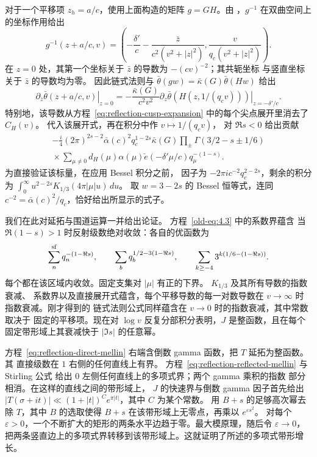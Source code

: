 对于一个平移项 $z_h=a/c$，使用上面构造的矩阵 $g=GH$。由
\cite[方程 (5.1)]{DR}，$g^{-1}$ 在双曲空间上的坐标作用给出
\[
 g^{-1}(z+a/c,v)=
 \left(-\frac{\delta'}c-\frac{\bar z}{c^2(v^2+|z|^2)},
               \frac{v}{q_c(v^2+|z|^2)}\right).
\]
在 $z=0$ 处，其第一个坐标关于
$\bar z$ 的导数为 $-(cv)^{-2}$；其共轭坐标
与竖直坐标关于 $\bar z$ 的导数均为零。
因此链式法则与 $\bar\theta(gw)=\bar\kappa(G)\bar\theta(Hw)$
给出
\[
 \left.\partial_{\bar z}\bar\theta(z+a/c,v)\right|_{z=0}
 =-\frac{\bar\kappa(G)}{c^2v^2}
   \left.\partial_z\bar\theta(H(z,1/(q_cv)))\right|_{z=-\delta'/c}.
\]
特别地，该导数从方程~\eqref{eq:reflection-cusp-expansion} 中的每个尖点展开里消去了 $C_H(v)$。
代入该展开式，再在积分中作 $v\mapsto1/(q_cv)$，
对 $\Re s<0$ 给出贡献
\begin{equation}\label{eq:reflection-reflected-mellin}
 \begin{split}
 -\frac i4(2\pi)^{2s-2}\bar\alpha(c)^2q_c^{1-2s}\bar\kappa(G)
 \prod_{\pm}\Gamma(3/2-s\pm1/6)\\
 {}
 \times\sum_{\mu\ne0}d_H(\mu)\alpha(\mu)
       \check e(-\delta'\mu/c)q_\mu^{-(1-s)}.
 \end{split}
\end{equation}
为直接验证该标量，在应用 Bessel 积分之前，
因子为 $-2\pi i c^{-2}q_c^{2-2s}$，剩余的积分为
$\int_0^\infty u^{2-2s}K_{1/3}(4\pi|\mu|u)\,du$。
取 $w=3-2s$ 的 Bessel 恒等式，连同
$c^{-2}=\bar\alpha(c)^2/q_c$，恰好给出所显示的式子。

我们在此对延拓与围道运算一并给出论证。
方程~\eqref{old-eq:4.3} 中的系数界蕴含
当 $\Re(1-s)>1$ 时反射级数绝对收敛：各自的优函数为
\[
 \sum_n^{\rm sf}q_n^{-(1-\Re s)},\qquad
 \sum_b q_b^{1/2-3(1-\Re s)},\qquad
 \sum_{k\ge-4}3^{k(1/6-(1-\Re s))}.
\]
每个都在该区域内收敛。固定支集对 $|\mu|$ 有正的下界。
$K_{1/3}$ 及其所有导数的指数衰减、
系数界以及直接展开式蕴含，每个平移导数的每一对数导数在
$v\to\infty$ 时指数衰减。刚才得到的
链式法则公式同样蕴含在 $v\to0$ 时的指数衰减，其中常数取决于
固定的平移项。现在对
$\log v$ 反复分部积分表明，$J$ 是整函数，且在每个固定带形域上其衰减快于
$|\Im s|$ 的任意幂。

方程~\eqref{eq:reflection-direct-mellin} 右端含倒数 gamma
函数，把 $T$ 延拓为整函数。其
直接级数在 $1$ 右侧的任何直线上有界。
方程~\eqref{eq:reflection-reflected-mellin} 与 Stirling 公式
给出 $0$ 左侧任何直线上的多项式界；两个 gamma 乘积的指数
部分相消。在这样的直线之间的带形域上，
$J$ 的快速界与倒数 gamma 因子首先给出
$|T(\sigma+it)|\ll (1+|t|)^C e^{\pi|t|}$，其中 $C$ 为某个常数。
用 $B+s$ 的足够高次幂去除 $T$，其中 $B$ 的选取使得
$B+s$ 在该带形域上无零点，再乘以 $e^{\varepsilon s^2}$。
对每个
$\varepsilon>0$，一个不断扩大的矩形的两条水平边趋于零。最大模原理，随后令
$\varepsilon\to0$，把两条竖直边上的多项式界转移到该带形域上。这就证明了所述的多项式带形增长。

